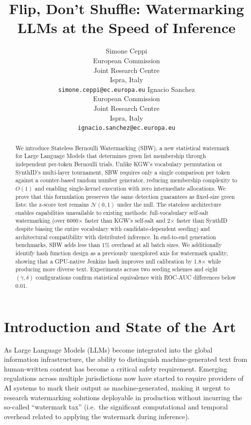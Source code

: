 \documentclass[11pt]{article}
\title{Flip, Don't Shuffle: Watermarking LLMs at the Speed of Inference}
\author{
  Simone Ceppi \\
  European Commission \\
  Joint Research Centre \\
  Ispra, Italy \\
  \texttt{simone.ceppi@ec.europa.eu}
  \And
  Ignacio Sanchez \\
  European Commission \\
  Joint Research Centre \\
  Ispra, Italy \\
  \texttt{ignacio.sanchez@ec.europa.eu}
}
\begin{document}
\maketitle
\begin{abstract}
We introduce Stateless Bernoulli Watermarking (SBW), a new statistical watermark for Large Language Models that determines green list membership through independent per-token Bernoulli trials. Unlike KGW's vocabulary permutation or SynthID's multi-layer tournament, SBW requires only a single comparison per token against a counter-based random number generator, reducing membership complexity to $O(1)$ and enabling single-kernel execution with zero intermediate allocations. We prove that this formulation preserves the same detection guarantees as fixed-size green lists: the z-score test remains $\mathcal{N}(0,1)$ under the null. The stateless architecture enables capabilities unavailable to existing methods: full-vocabulary self-salt watermarking (over 6000$\times$ faster than KGW's self-salt and 2$\times$ faster than SynthID despite biasing the entire vocabulary with candidate-dependent seeding) and architectural compatibility with distributed inference. In end-to-end generation benchmarks, SBW adds less than 1\% overhead at all batch sizes. We additionally identify hash function design as a previously unexplored axis for watermark quality, showing that a GPU-native Jenkins hash improves null calibration by 1.8$\times$ while producing more diverse text. Experiments across two seeding schemes and eight $(\gamma, \delta)$ configurations confirm statistical equivalence with ROC-AUC differences below 0.01.
\end{abstract}

\section{Introduction and State of the Art}

As Large Language Models (LLMs) become integrated into the global information infrastructure, the ability to distinguish machine-generated text from human-written content has become a critical safety requirement. Emerging regulations across multiple jurisdictions now have started to require providers of AI systems to mark their output as machine-generated, making it urgent to research watermarking solutions deployable in production without incurring the so-called ``watermark tax'' (i.e.\ the significant computational and temporal overhead related to applying the watermark during inference).
\end{document}
